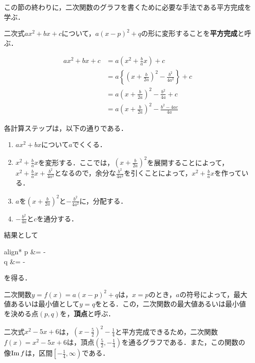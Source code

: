この節の終わりに，二次関数のグラフを書くために必要な手法である平方完成を学ぶ．
\begin{definition}[平方完成]
	二次式$ax^2+bx+c$について，$a(x-p)^2+q$の形に変形することを\textbf{平方完成}と呼ぶ．
\end{definition}
\begin{algorithm}
	\begin{align}
		ax^2+bx+c &= a\left(x^2+\frac{b}{a}x\right)+c \tag{1} \\
		&= a\left\{\left(x+\frac{b}{2a}\right)^2-\frac{b^2}{4a^2}\right\}+c \tag{2} \\
		&= a\left(x+\frac{b}{2a}\right)^2-\frac{b^2}{4a}+c \tag{3} \\
		&= a\left(x+\frac{b}{2a}\right)^2-\frac{b^2-4ac}{4a} \tag{4}
	\end{align}
	
	各計算ステップは，以下の通りである．
	\begin{enumerate}[(1)]
		\item $ax^2+bx$について$a$でくくる．
		\item $x^2+\frac{b}{a}x$を変形する．ここでは，$\left(x+\frac{b}{2a}\right)^2$を展開することによって，$x^2+\frac{b}{a}x+\frac{b^2}{4a^2}$となるので，余分な$\frac{b^2}{4a^2}$を引くことによって，$x^2+\frac{b}{a}x$を作っている．
		\item $a$を$\left(x+\frac{b}{2a}\right)^2$と$-\frac{b^2}{4a^2}$に，分配する．
		\item $-\frac{b^2}{4a}$と$c$を通分する．
	\end{enumerate}

	結果として
	\begin{empheq}[left=\empheqlbrace]{align*}
		p &= - \\
		q &= -
	\end{empheq}
	を得る．
\end{algorithm}
\begin{rem*}
	二次関数$y = f(x) = a(x-p)^2+q$は，$x = p$のとき，$a$の符号によって，最大値あるいは最小値として$y = q$をとる．この，二次関数の最大値あるいは最小値を決める点$(p, q)$を，\textbf{頂点}と呼ぶ．
\end{rem*}
\begin{example*}
	二次式$x^2-5x+6$は，$\left(x-\frac{5}{2}\right)^2-\frac{1}{4}$と平方完成できるため，二次関数$f(x) = x^2-5x+6$は，頂点$\left(\frac{5}{2}, -\frac{1}{4}\right)$を通るグラフである．また，この関数の像$\operatorname{Im} f$は，区間$\left[-\frac{1}{4}, \infty\right)$である．
\end{example*}


